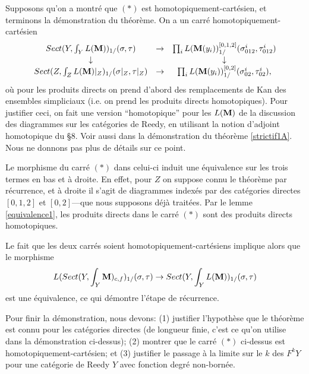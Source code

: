 \documentclass[12pt]{article}
\newcommand{\mm}{{\bf M}}
\begin{document}
Supposons qu'on a montr\'e que $(\ast )$ est homotopiquement-cart\'esien,
et terminons la d\'emonstration du th\'eor\`eme.
On a un carr\'e homotopiquement-cart\'esien
$$
\begin{array}{ccc}
Sect (Y, \int _Y L(\mm ))_{1/}(\sigma , \tau )
&\rightarrow & \prod _i L(\mm (y_i))^{[0,1,2]}_{1/}(\sigma ^i_{012},\tau ^i
_{012})\\ \downarrow && \downarrow \\
Sect (Z, \int _Z L(\mm )|_Z)_{1/}(\sigma |_Z, \tau |_Z)
& \rightarrow & \prod _i L(\mm (y_i))^{[0,2]}_{1/}(\sigma ^i_{02},\tau
^i_{02}), \end{array}
$$
o\`u pour les produits directs on prend d'abord des remplacements de Kan des
ensembles simpliciaux (i.e. on prend les produits directs homotopiques). Pour
justifier ceci, on fait une version ``homotopique'' pour les $L(\mm )$ de la
discussion des diagrammes sur les cat\'egories de Reedy, en utilisant la notion
d'adjoint homotopique du \S 8. Voir aussi dans la d\'emonstration du
th\'eor\`eme \ref{strictif1A}. Nous ne donnons pas plus de d\'etails
sur ce point.

Le morphisme du carr\'e $(\ast )$ dans celui-ci
induit une \'equivalence sur les trois termes
en bas et \`a droite. En effet, pour $Z$ on suppose
connu le th\'eor\`eme par r\'ecurrence, et \`a droite il s'agit de diagrammes
index\'es par des cat\'egories directes $[0,1,2]$ et $[0,2]$---que nous
supposons
d\'ej\`a trait\'ees.
Par le lemme
\ref{equivalence1}, les produits directs dans le carr\'e $(\ast )$ sont des
produits directs homotopiques.

Le fait que les deux carr\'es soient
homotopiquement-cart\'esiens implique alors que le morphisme
$$
L(Sect (Y, \int _Y\mm )_{c,f})_{1/}(\sigma , \tau )
\rightarrow Sect (Y, \int _Y L(\mm ))_{1/}(\sigma , \tau )
$$
est une \'equivalence, ce qui d\'emontre l'\'etape de r\'ecurrence.

Pour finir la d\'emonstration, nous devons: (1) justifier l'hypoth\`ese que
le th\'eor\`eme est connu pour les cat\'egories directes (de longueur finie,
c'est ce qu'on utilise dans la d\'emonstration ci-dessus); (2) montrer que le
carr\'e $(\ast )$ ci-dessus est homotopiquement-cart\'esien; et (3) justifier le
passage \`a la limite sur
le $k$ des $F^kY$ pour une cat\'egorie de Reedy $Y$ avec
fonction degr\'e  non-born\'ee.
\end{document}
